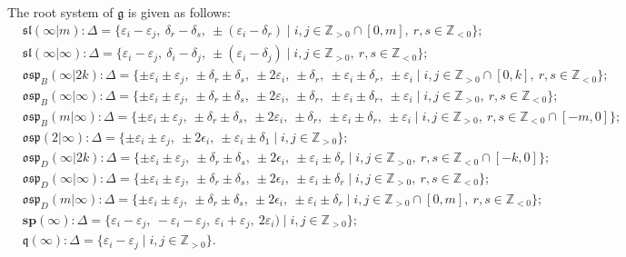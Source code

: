 \documentclass[12pt]{amsart}
\newcommand\Z{\mathbb{Z}}
\newcommand\g{\mathfrak{g}}
\newcommand\fq{\mathfrak{q}}
\newcommand\fsl{\mathfrak{sl}}
\newcommand\fosp{\mathfrak{osp}}
\newcommand\D{\Delta}
\newcommand\bsp{\mathbf{sp}}
\theoremstyle{plain}
\theoremstyle{definition}
\numberwithin{equation}{section}
\begin{document}
The root system of $\g$ is given as follows:
{\footnotesize{\begin{align*}
& \fsl(\infty | m) : \D = \{\varepsilon_i - \varepsilon_j,\ \delta_r - \delta_s,\ \pm(\varepsilon_i - \delta_r)\mid i,j\in \Z_{>0}\cap [0,m],\ r,s\in \Z_{<0}\}; \\
& \fsl(\infty|\infty) : \D = \{\varepsilon_i - \varepsilon_j,\ \delta_i - \delta_j,\ \pm(\varepsilon_i - \delta_j)\mid i,j\in \Z_{>0},\ r,s\in \Z_{<0}\}; \\
& \fosp_B(\infty|2k) :  \D = \{\pm \varepsilon_i \pm \varepsilon_j,\ \pm \delta_r \pm \delta_s,\ \pm 2 \varepsilon_i,\ \pm\delta_r,\ \pm \varepsilon_i \pm \delta_r,\ \pm \varepsilon_i \mid i,j\in \Z_{>0}\cap [0,k],\ r,s\in \Z_{<0}\}; \\
& \fosp_B(\infty|\infty) : \D = \{\pm \varepsilon_i \pm \varepsilon_j,\ \pm \delta_r \pm \delta_s,\ \pm 2 \varepsilon_i,\ \pm\delta_r,\ \pm \varepsilon_i \pm \delta_r,\ \pm \varepsilon_i \mid i,j\in \Z_{>0},\ r,s\in \Z_{<0}\}; \\
& \fosp_B(m|\infty) : \D = \{\pm \varepsilon_i \pm \varepsilon_j,\ \pm \delta_r \pm \delta_s,\ \pm 2 \varepsilon_i,\ \pm\delta_r,\ \pm \varepsilon_i \pm \delta_r,\ \pm \varepsilon_i \mid  i,j\in \Z_{>0},\ r,s\in \Z_{<0}\cap [-m,0]\}; \\
& \fosp(2|\infty) : \D = \{\pm \varepsilon_i \pm \varepsilon_j,\ \pm 2 \epsilon_i,\ \pm \varepsilon_i \pm \delta_1 \mid i,j\in \Z_{>0}\}; \\
& \fosp_D(\infty|2k) : \D = \{\pm \varepsilon_i \pm \varepsilon_j,\ \pm \delta_r \pm \delta_s,\ \pm 2 \epsilon_i,\ \pm \varepsilon_i \pm \delta_r \mid  i,j\in \Z_{>0},\ r,s\in \Z_{<0}\cap [-k,0]\}; \\
& \fosp_D(\infty|\infty) : \D = \{\pm \varepsilon_i \pm \varepsilon_j,\ \pm \delta_r \pm \delta_s,\ \pm 2 \epsilon_i,\ \pm \varepsilon_i \pm \delta_r \mid  i,j\in \Z_{>0},\ r,s\in \Z_{<0}\}; \\
& \fosp_D(m|\infty) :  \D = \{\pm \varepsilon_i \pm \varepsilon_j,\ \pm \delta_r \pm \delta_s,\ \pm 2 \epsilon_i,\ \pm \varepsilon_i \pm \delta_r \mid  i,j\in \Z_{>0}\cap [0,m],\ r,s\in \Z_{<0}\}; \\
& \bsp(\infty) :  \D = \{\varepsilon_i - \varepsilon_j,\ -\varepsilon_i - \varepsilon_j,\ \varepsilon_i + \varepsilon_j,\ 2\varepsilon_i)\mid i,j\in \Z_{>0}\}; \\
& \fq(\infty) :  \D = \{\varepsilon_i - \varepsilon_j \mid i,j\in \Z_{>0}\}.
\end{align*}}}
\end{document}
